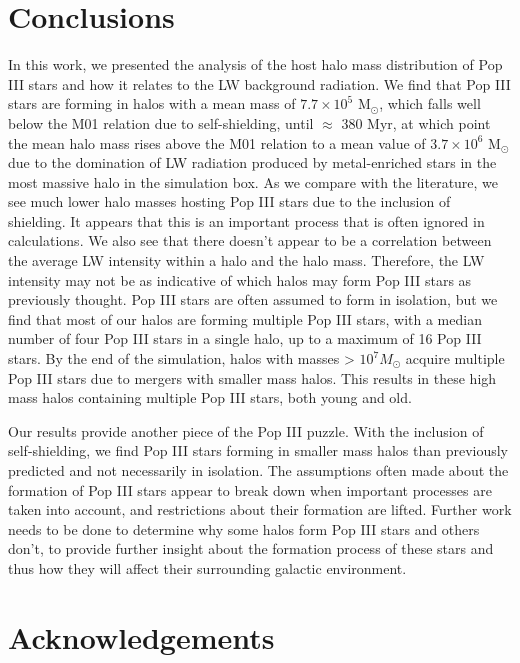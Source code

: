\documentclass[a4paper,fleqn,usenatbib]{mnras}
\begin{document}
\section{Conclusions}
In this work, we presented the analysis of the host halo mass distribution of Pop III stars and how it relates to the LW background radiation. We find that Pop III stars are forming in halos with a mean mass of $7.7 \times 10^{5}$ M$_{\odot}$, which falls well below the M01 relation due to \hh{} self-shielding, until $\approx$ 380 Myr, at which point the mean halo mass rises above the M01 relation to a mean value of $3.7 \times 10^{6}$ M$_{\odot}$ due to the domination of LW radiation produced by metal-enriched stars in the most massive halo in the simulation box. As we compare with the literature, we see much lower halo masses hosting Pop III stars due to the inclusion of \hh{} shielding. It appears that this is an important process that is often ignored in calculations. We also see that there doesn't appear to be a correlation between the average LW intensity within a halo and the halo mass. Therefore, the LW intensity may not be as indicative of which halos may form Pop III stars as previously thought. Pop III stars are often assumed to form in isolation, but we find that most of our halos are forming multiple Pop III stars, with a median number of four Pop III stars in a single halo, up to a maximum of 16 Pop III stars. By the end of the simulation, halos with masses > $10^{7} M_{\odot}$ acquire multiple Pop III stars due to mergers with smaller mass halos. This results in these high mass halos containing multiple Pop III stars, both young and old. 

Our results provide another piece of the Pop III puzzle. With the inclusion of \hh{} self-shielding, we find Pop III stars forming in smaller mass halos than previously predicted and not necessarily in isolation. The assumptions often made about the formation of Pop III stars appear to break down when important processes are taken into account, and restrictions about their formation are lifted. Further work needs to be done to determine why some halos form Pop III stars and others don't, to provide further insight about the formation process of these stars and thus how they will affect their surrounding galactic environment. 

\section*{Acknowledgements}
\end{document}
